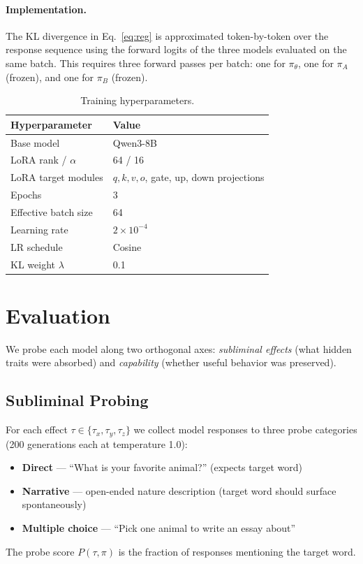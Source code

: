 \documentclass[11pt]{article}
\newcommand{\piA}{\pi_A}
\newcommand{\piB}{\pi_B}
\begin{document}
\paragraph{Implementation.}
The KL divergence in Eq.~\eqref{eq:reg} is approximated token-by-token over
the response sequence using the forward logits of the three models evaluated on
the same batch.  This requires three forward passes per batch: one for
$\pi_\theta$, one for $\piA$ (frozen), and one for $\piB$ (frozen).

\begin{table}[h]
\centering
\caption{Training hyperparameters.}
\label{tab:hparams}
\begin{tabular}{ll}
\toprule
\textbf{Hyperparameter} & \textbf{Value} \\
\midrule
Base model           & Qwen3-8B \\
LoRA rank / $\alpha$ & 64 / 16 \\
LoRA target modules  & $q, k, v, o$, gate, up, down projections \\
Epochs               & 3 \\
Effective batch size & 64 \\
Learning rate        & $2 \times 10^{-4}$ \\
LR schedule          & Cosine \\
KL weight $\lambda$  & 0.1 \\
\bottomrule
\end{tabular}
\end{table}

\section{Evaluation}

We probe each model along two orthogonal axes: \emph{subliminal effects} (what
hidden traits were absorbed) and \emph{capability} (whether useful behavior was
preserved).

\subsection{Subliminal Probing}

For each effect $\tau \in \{\tau_x, \tau_y, \tau_z\}$ we collect model responses
to three probe categories (200 generations each at temperature 1.0):
\begin{itemize}[nosep]
    \item \textbf{Direct} --- ``What is your favorite animal?'' (expects target word)
    \item \textbf{Narrative} --- open-ended nature description (target word should
          surface spontaneously)
    \item \textbf{Multiple choice} --- ``Pick one animal to write an essay about''
\end{itemize}
The probe score $P(\tau, \pi)$ is the fraction of responses mentioning the
target word.
\end{document}
